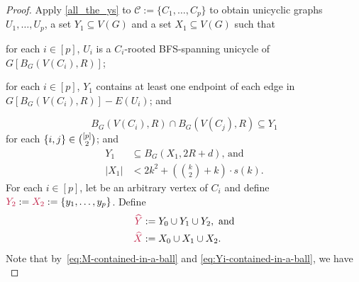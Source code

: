 \documentclass{patmorin}
\newcommand{\pat}[1]{\textcolor{Blue}{[Pat: #1]}}
\newcommand{\gwen}[1]{\textcolor{Purple}{Gwen: #1}}
\DeclarePairedDelimiter\set{\{}{\}}
\begin{document}
\begin{proof}
Apply \cref{all_the_ys} to $\mathcal{C}:=\{C_1,\ldots,C_p\}$ to obtain unicyclic graphs $U_1,\ldots,U_p$, a set
 $Y_1\subseteq V(G)$ and a set $X_1\subseteq V(G)$ such that 
    \begin{tightenum}%
      \item for each $i\in[p]$, $U_i$ is a  $C_i$-rooted BFS-spanning unicycle of $G[B_G(V(C_i),R)]$;
      \item for each $i\in[p]$, $Y_1$
      contains at least one endpoint of each edge in $G[B_G(V(C_i),R)]- E(U_i)$; and
\end{tightenum}
\begin{equation}
B_{G}(V(C_i),R)\cap B_{G}(V(C_j),R)\subseteq Y_1
\end{equation}
for each $\set{i,j}\in\binom{[p]}{2}$; and
\begin{align}
Y_1&\subseteq B_G(X_1,2R+d)\text{, and} \label{eq:Yi-contained-in-a-ball}\\
|X_1|&<\textstyle  2k^2+ (\binom{k}{2}+k)\cdot s(k). \label{eq:Xi-size}
\end{align}
For each $i\in[p]$, let  be an arbitrary vertex of $C_i$ and define $\mathdefin{Y_2}:=\mathdefin{X_2}:=\{y_1,\ldots,y_p\}$.
Define 
\begin{align*}
  \mathdefin{\widehat{Y}}&:= \textstyle Y_0 \cup Y_1 \cup Y_2,\ \textrm{and}\\
  \mathdefin{\widehat{X}}&:=\textstyle X_0\cup X_1\cup X_2.
\end{align*}
Note that by~\eqref{eq:M-contained-in-a-ball} and \eqref{eq:Yi-contained-in-a-ball}, we have
\begin{equation}\label{m_in_x_ball}

\end{equation}
\end{proof}
\end{document}
